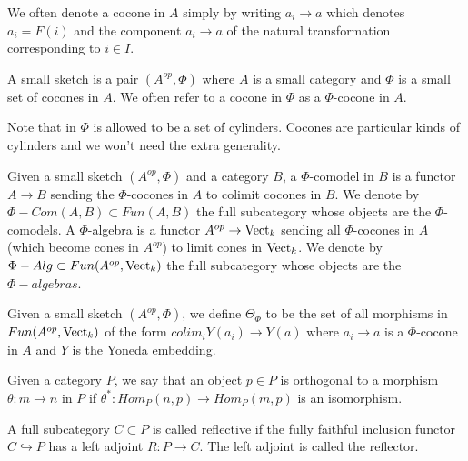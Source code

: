 We often denote a cocone in $A$ simply by writing $a_i\to a$ which denotes $a_i=F(i)$ and the component $a_i\to a$ of the natural transformation corresponding to $i\in I$.


\begin{definition}
A small sketch is a pair $(A^{op},\Phi)$ where $A$ is a small category and $\Phi$ is a small set of cocones in $A$. We often refer to a cocone in $\Phi$ as a $\Phi$-cocone in $A$.\end{definition}

\begin{remark}Note that in \cite{kelly/basic-concepts-enriched} $\Phi$ is allowed to be a set of cylinders. Cocones are particular kinds of cylinders and we won't need the extra generality.\end{remark}

\begin{definition}
Given a small sketch $(A^{op},\Phi)$ and a category $B$, a $\Phi$-comodel in $B$ is a functor $A\to B$ sending the $\Phi$-cocones in $A$ to colimit cocones in $B$. We denote by $\Phi-Com(A,B)\subset Fun(A,B)$ the full subcategory whose objects are the $\Phi$-comodels. A $\Phi$-algebra is a functor $A^{op}\to \operatorname{Vect}_k$ sending all $\Phi$-cocones in $A$ (which become cones in $A^{op}$) to limit cones in $\operatorname{Vect}_k$. We denote by $\Phi-Alg\subset Fun(A^{op},\operatorname{Vect}_k)$ the full subcategory whose objects are the $\Phi-algebras$.
\end{definition}


\begin{definition}

Given a small sketch $(A^{op},\Phi)$, we define $\Theta_{\Phi}$ to be the set of all morphisms in $Fun(A^{op},\operatorname{Vect}_k)$ of the form $colim_i Y(a_i)\to Y(a)$ where $a_i\to a$ is a $\Phi$-cocone in $A$ and $Y$ is the Yoneda embedding.\end{definition}

\begin{definition}

Given a category $P$, we say that an object $p\in P$ is orthogonal to a morphism $\theta:m\to n$ in $P$ if $\theta^*:Hom_P(n,p)\to Hom_P(m,p)$ is an isomorphism.\end{definition}

\begin{definition}
A full subcategory $C\subset P$ is called reflective if the fully faithful inclusion functor $C\hookrightarrow P$ has a left adjoint $R:P\to C$. The left adjoint is called the reflector.\end{definition}

